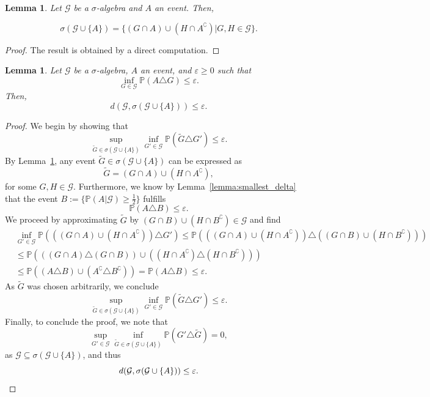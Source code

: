 \documentclass[a4paper, 10pt]{article}
\numberwithin{theorem}{section}
\newtheorem{lemma}[theorem]{Lemma}
\theoremstyle{definition}
\newcommand{\G}{\mathcal{G}}
\renewcommand{\epsilon}{\varepsilon}
\renewcommand{\P}{\mathbb{P}}
\begin{document}
\begin{lemma}\label{lemma:adding_set_to_sigma_algebra}
	Let $\G$ be a $\sigma$-algebra and $A$ an event. Then,
	
	$$\sigma(\G \cup \{A\})= \{(G \cap A) \cup (H \cap A^\complement) | G,H\in \G\}. $$
\end{lemma}
\begin{proof}
    The result is obtained by a direct computation.
\end{proof}





\begin{lemma}\label{lemma:distance_for_sigma_algebras}
	Let $\G$ be a $\sigma$-algebra, $A$ an event, and $\epsilon \geq 0$ such that
	$$ \inf_{G\in \G} \P(A \triangle G) \leq \epsilon. $$
	Then,
	$$d(\G, \sigma(\G \cup \{A\})) \leq \epsilon.$$
\end{lemma}

\begin{proof}
	We begin by showing that 
	$$ \sup_{\tilde{G} \in \sigma(\G \cup \{A\})} \inf_{G'\in \G} \P(\tilde{G} \triangle G') \leq \epsilon.$$
	By Lemma~\ref{lemma:adding_set_to_sigma_algebra}, any event $\tilde{G} \in  \sigma(\G \cup \{A\})$ can be expressed as
	$$\tilde{G}=(G \cap A) \cup (H \cap A^\complement),$$
	for some $G,H \in \G.$ Furthermore, we know by Lemma~\ref{lemma:smallest_delta} that the event $B:=\{\P(A|\G)\geq \frac{1}{2}\}$ fulfills
		$$\P(A\triangle B) \leq \epsilon .$$
	We proceed by approximating $\tilde{G}$ by $(G \cap B) \cup (H \cap B^\complement) \in \G$ and find
	\begin{align*}
		&\inf_{G'\in \G} \P(((G \cap A) \cup (H \cap A^\complement) ) \triangle G')  \leq \P( ((G \cap A) \cup (H \cap A^\complement)) \triangle( (G \cap B) \cup (H \cap B^\complement) ) ) \\
		&\leq \P((( G \cap A) \triangle (G \cap B)) \cup ((H \cap A^\complement) \triangle (H \cap B^\complement)))  \\ 
		&\leq \P( (A\triangle B)  \cup (A^\complement \triangle B^\complement)) = \P(A\triangle B) \leq \epsilon.
	\end{align*}
	As $\tilde{G}$ was chosen arbitrarily, we conclude
	$$ \sup_{\tilde{G} \in \sigma(\G \cup \{A\})} \inf_{G'\in \G} \P(\tilde{G} \triangle G') \leq \epsilon.$$
	Finally, to conclude the proof, we note that
	$$\sup_{G'\in \G}\inf_{\tilde{G} \in \sigma(\G \cup \{A\})} \P(G' \triangle \tilde{G}) =0,$$
	as $\G \subseteq \sigma(\G \cup \{A\})$, and thus
	\[ d(\G, \sigma(\G \cup \{A\})) \leq \epsilon.\qedhere\]
\end{proof}
\end{document}
